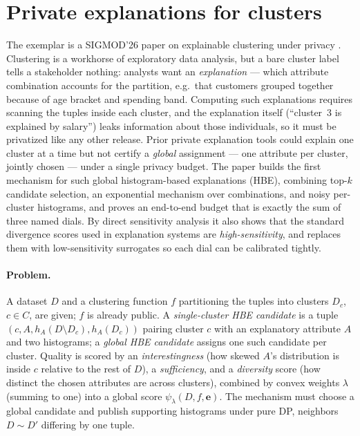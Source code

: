 \section{Private explanations for clusters}
\label{sec:dp-298}

The exemplar is a SIGMOD'26 paper on explainable clustering under privacy
\citep{sigmod26-298}. Clustering is a workhorse of exploratory data analysis, but a bare
cluster label tells a stakeholder nothing: analysts want an \emph{explanation} --- which
attribute combination accounts for the partition, e.g.\ that customers grouped together
because of age bracket and spending band. Computing such explanations requires scanning
the tuples inside each cluster, and the explanation itself (``cluster~3 is explained by
salary'') leaks information about those individuals, so it must be privatized like any
other release. Prior private explanation tools could explain one cluster at a time but
not certify a \emph{global} assignment --- one attribute per cluster, jointly chosen
--- under a single privacy budget. The paper builds the first mechanism for such global
histogram-based explanations (HBE), combining top-$k$ candidate selection, an
exponential mechanism over combinations, and noisy per-cluster histograms, and proves an
end-to-end budget that is exactly the sum of three named dials. By direct sensitivity
analysis it also shows that the standard divergence scores used in explanation systems
are \emph{high-sensitivity}, and replaces them with low-sensitivity surrogates so each
dial can be calibrated tightly.

\paragraph{Problem.}
A dataset $D$ and a clustering function $f$ partitioning the tuples into clusters
$D_c$, $c \in C$, are given; $f$ is already public. A \emph{single-cluster HBE
candidate} is a tuple $(c, A, h_A(D \setminus D_c), h_A(D_c))$ pairing cluster $c$ with
an explanatory attribute $A$ and two histograms; a \emph{global HBE candidate} assigns
one such candidate per cluster. Quality is scored by an \emph{interestingness} (how
skewed $A$'s distribution is inside $c$ relative to the rest of $D$), a
\emph{sufficiency}, and a \emph{diversity} score (how distinct the chosen attributes
are across clusters), combined by convex weights $\lambda$ (summing to one) into a
global score $\psi_\lambda(D, f, \mathbf{e})$. The mechanism must choose a global
candidate and publish supporting histograms under pure DP, neighbors $D \sim D'$
differing by one tuple.

